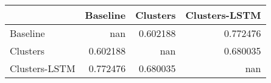 \begin{tabular}{lrrr}
\toprule
               &   Baseline &   Clusters &   Clusters-LSTM \\
\midrule
 Baseline      & nan        &   0.602188 &        0.772476 \\
 Clusters      &   0.602188 & nan        &        0.680035 \\
 Clusters-LSTM &   0.772476 &   0.680035 &      nan        \\
\bottomrule
\end{tabular}